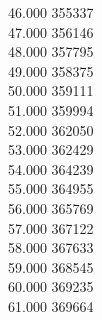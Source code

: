 { 46.000	355337 \\
 47.000	356146 \\
 48.000	357795 \\
 49.000	358375 \\
 50.000	359111 \\
 51.000	359994 \\
 52.000	362050 \\
 53.000	362429 \\
 54.000	364239 \\
 55.000	364955 \\
 56.000	365769 \\
 57.000	367122 \\
 58.000	367633 \\
 59.000	368545 \\
 60.000	369235 \\
 61.000	369664 \\
}
